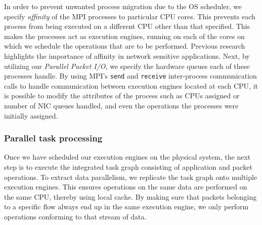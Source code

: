 \documentclass[conference]{IEEEtran}
\newcommand{\comment}[1]{}
\begin{document}
In order to prevent unwanted process migration due to the OS scheduler, we specify \textit{affinity} of the MPI processes to particular CPU cores. This prevents each process from being executed on a different CPU other than that specified. This makes the processes act as execution engines, running on each of the cores on which we schedule the operations that are to be performed. Previous research \cite{Salehi:1996:EAS:234766.234769}\cite{1409136} highlights the importance of affinity in network sensitive applications. Next, by utilizing our \textit{Parallel Packet I/O}, we specify the hardware queues each of these processes handle. \comment{Initially we divide the queues evenly among the different processes we create, but later during execution we could modify the allocation based on the application operations scheduled on them. Our modifications to \texttt{netmap}'s hardware queue assignment API can help us here in redistributing the queues to different processes.} By using MPI's \texttt{send} and \texttt{receive} inter-process communication calls to handle communication between execution engines located at each CPU, it is possible to modify the attributes of the process such as CPUs assigned or number of NIC queues handled, and even the operations the processes were initially assigned.

\subsubsection{Parallel task processing}
\label{ppt}

Once we have scheduled our execution engines on the physical system, the next step is to execute the integrated task graph consisting of application and packet operations. To extract data parallelism, we replicate the task graph onto multiple execution engines. This ensures operations on the same data are performed on the same CPU, thereby using local cache. By making sure that packets belonging to a specific flow always end up in the same execution engine, we only perform operations conforming to that stream of data. \comment{We use the ability of modern NICs to classify packets onto different queues, based on their attributes.}


\comment{
\lstset{language=C,caption={Packet Payload Modification Function},label=payload_sub}
\begin{lstlisting}
bool payload_copy( const void *payload_data, uint32_t length )
{
    uint32_t headroom = _data - _head;
    uint32_t tailroom = _end - _tail;
    uint32_t orig_length = _tail - _data;
    uint32_t n = length + headroom + tailroom;
    if( n < min_buffer_length )
    {
        tailroom = min_buffer_length - length - headroom;
        n = min_buffer_length;
    }
    _data = _head + headroom;
    _tail = _data + length;
    if( payload_data )
        memcpy( _data, payload_data, length );
    return true;
}
\end{lstlisting}
}
\end{document}
